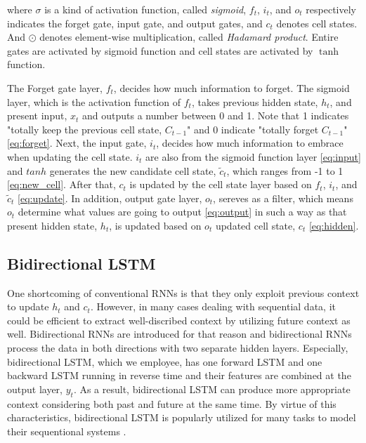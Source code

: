 \documentclass{ieeeaccess}
\begin{document}
where $\sigma$ is a kind of activation function, called \textit{sigmoid},  $f_{t}$, $i_{t}$, and $o_{t}$ respectively indicates the forget gate, input gate, and output gates, and $c_{t}$ denotes cell states. And $\odot$ denotes element-wise multiplication, called \textit{Hadamard product}. Entire gates are activated by sigmoid function and cell states are activated by $\tanh$ function.

The Forget gate layer, $f_{t}$, decides how much information to forget. The sigmoid layer, which is the activation function of $f_{t}$, takes previous hidden state, $h_{t}$, and present input, $x_{t}$ and outputs a number between 0 and 1. Note that 1 indicates "totally keep the previous cell state, $C_{t-1}$" and 0 indicate "totally forget $C_{t-1}$" \eqref{eq:forget}. Next, the input gate, $i_{t}$, decides how much information to embrace when updating the cell state. $i_{t}$ are also from the sigmoid function layer \eqref{eq:input} and $tanh$ generates the new candidate cell state, $\tilde{c}_{t}$, which ranges from -1 to 1 \eqref{eq:new_cell}. After that, $c_{t}$ is updated by the cell state layer based on $f_{t}$, $i_{t}$, and $\tilde{c}_{t}$ \eqref{eq:update}. In addition, output gate layer, $o_{t}$, sereves as a filter, which means $o_{t}$ determine what values are going to output \eqref{eq:output} in such a way as that present hidden state, $h_{t}$, is updated based on $o_{t}$ updated cell state, $c_{t}$ \eqref{eq:hidden}. 


\subsection{Bidirectional LSTM}

One shortcoming of conventional RNNs is that they only exploit previous context to update $h_{t}$ and $c_{t}$. However, in many cases dealing with sequential data, it could be efficient to extract well-discribed context by utilizing future context as well. Bidirectional RNNs are introduced\cite{schuster1997bidirectional} for that reason and bidirectional RNNs process the data in both directions with two separate hidden layers. Especially, bidirectional LSTM, which we employee, has one forward LSTM and one backward LSTM running in reverse time and their features are combined at the output layer, $y_{t}$. As a result, bidirectional LSTM can produce more appropriate context considering both past and future at the same time. By virtue of this characteristics, bidirectional LSTM is popularly utilized for many tasks to model their sequentional systems \cite{zhang2017multi,li2018human,ullah2018action}. 
\end{document}

